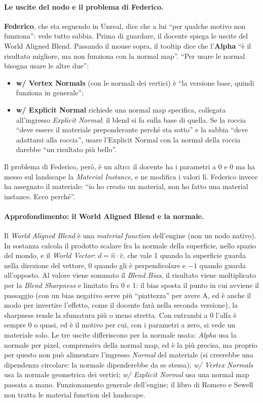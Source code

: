 \paragraph{Le uscite del nodo e il problema di Federico.} \textbf{Federico}, che sta seguendo
in Unreal, dice che a lui ``per qualche motivo non funziona'': vede tutto sabbia. Prima di
guardare, il docente spiega le uscite del World Aligned Blend. Passando il mouse sopra, il
tooltip dice che l'\textbf{Alpha} ``è il risultato migliore, ma non funziona con la normal
map''. ``Per usare le normal bisogna usare le altre due'':
\begin{itemize}
  \item \textbf{w/ Vertex Normals} (con le normali dei vertici) è ``la versione base, quindi
        funziona in generale'';
  \item \textbf{w/ Explicit Normal} richiede una normal map specifica, collegata
        all'ingresso \emph{Explicit Normal}: il blend si fa sulla base di quella. Se la
        roccia ``deve essere il materiale preponderante perché sta sotto'' e la sabbia ``deve
        adattarsi alla roccia'', usare l'Explicit Normal con la normal della roccia darebbe
        ``un risultato più bello''.
\end{itemize}
Il problema di Federico, però, è un altro: il docente ha i parametri a 0 e 0 ma ha messo sul
landscape la \emph{Material Instance}, e ne modifica i valori lì. Federico invece ha
assegnato il materiale: ``io ho creato un material, non ho fatto una material instance.
Ecco perché''.

\paragraph{Approfondimento: il World Aligned Blend e la normale.} Il \emph{World Aligned
Blend} è una \emph{material function} dell'engine (non un nodo nativo). In sostanza calcola
il prodotto scalare fra la normale della superficie, nello spazio del mondo, e il
\emph{World Vector}: $d=\hat n\cdot\hat v$, che vale 1 quando la superficie guarda nella
direzione del vettore, 0 quando gli è perpendicolare e $-1$ quando guarda all'opposto. Al
valore viene sommato il \emph{Blend Bias}, il risultato viene moltiplicato per la
\emph{Blend Sharpness} e limitato fra 0 e 1: il bias sposta il punto in cui avviene il
passaggio (con un bias negativo serve più ``piattezza'' per avere A, ed è anche il modo per
invertire l'effetto, come il docente farà nella seconda versione), la sharpness rende la
sfumatura più o meno stretta. Con entrambi a 0 l'alfa è sempre 0 o quasi, ed è il motivo
per cui, con i parametri a zero, si vede un materiale solo. Le tre uscite differiscono per
la normale usata: \emph{Alpha} usa la normale per pixel, comprensiva della normal map, ed è
la più precisa, ma proprio per questo non può alimentare l'ingresso \emph{Normal} del
materiale (si creerebbe una dipendenza circolare: la normale dipenderebbe da se stessa);
\emph{w/ Vertex Normals} usa la normale geometrica dei vertici; \emph{w/ Explicit Normal}
usa una normal map passata a mano. Funzionamento generale dell'engine; il libro di Romero e
Sewell non tratta le material function del landscape.


